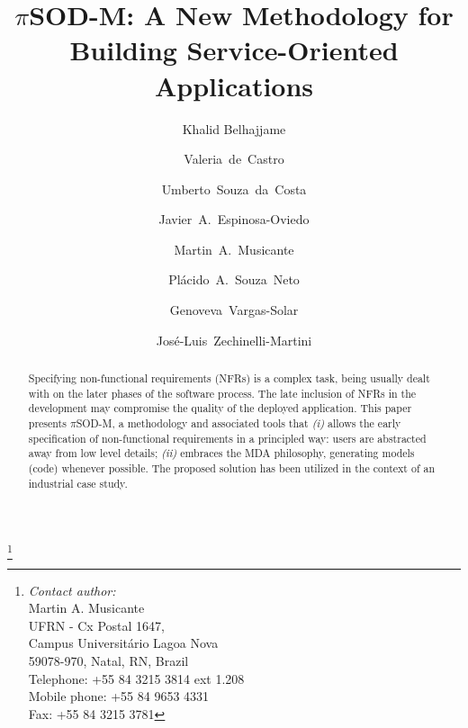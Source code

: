 \documentclass[twocolumn]{svjour3}
\newcommand{\pisodm}[0]{$\pi$SOD-M\xspace}
\begin{document}
\title{\pisodm: A New Methodology for Building Service-Oriented Applications}\thanks{\textsl{Contact author:}\\
Martin A. Musicante\\
UFRN - Cx Postal 1647, \\
Campus Universitário Lagoa Nova \\
59078-970, Natal, RN, Brazil\\[2mm]
Telephone: +55 84 3215 3814 ext 1.208\\
Mobile phone: +55 84 9653 4331\\
Fax: +55 84 3215 3781}


\author{Khalid Belhajjame \and Valeria~de~Castro \and Umberto~Souza~da~Costa \and Javier~A.~Espinosa-Oviedo \and Martin~A.~Musicante \and Pl\'acido~A.~Souza~Neto \and Genoveva~Vargas-Solar \and Jos\'e-Luis~Zechinelli-Martini}


\maketitle

\begin{abstract}

Specifying non-functional requirements (NFRs) is a complex task, being usually dealt with on the later phases of the software process.
The late inclusion of NFRs in the development may compromise the quality of the deployed application.
This paper presents \pisodm, a methodology and associated tools that 
\textit{(i)}  allows the early specification of non-functional requirements in a principled way: users are abstracted away from low level details; 
\textit{(ii)} embraces the MDA philosophy, generating models (code) whenever possible.
The pro\-po\-sed solution has been utilized in the context of an industrial case study.
\end{abstract}
\end{document}
